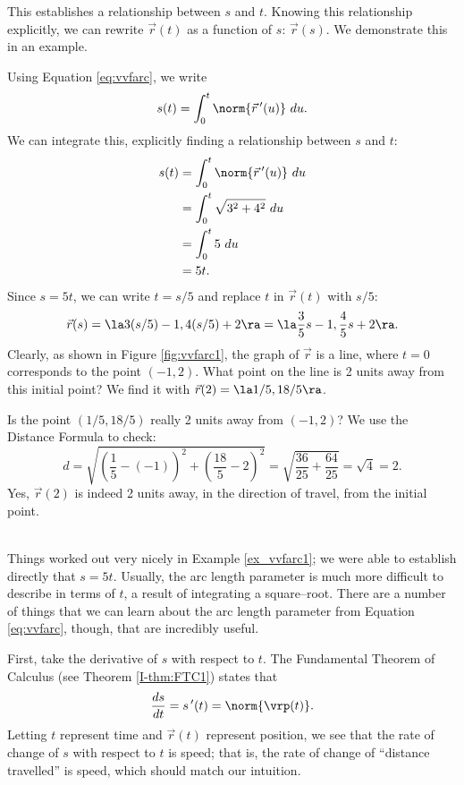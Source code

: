 This establishes a relationship between $s$ and $t$. Knowing this relationship explicitly, we can rewrite $\vec r(t)$ as a function of $s$: $\vec r(s)$. We demonstrate this in an example.\\

{Using Equation \eqref{eq:vvfarc}, we write
\[
s(t) = \int_0^t \norm{\vec r\,'(u)}\ du.
\]
We can integrate this, explicitly finding a relationship between $s$ and $t$:
\begin{align*}
s(t) &= \int_0^t \norm{\vec r\,'(u)}\ du \\
			&= \int_0^t \sqrt{3^2+4^2}\ du\\
			&= \int_0^t 5\ du\\
			&= 5t.
\end{align*}
Since $s=5t$, we can write $t=s/5$ and replace $t$ in $\vec r(t)$ with $s/5$:
\[
\vec r(s) = \la 3(s/5)-1, 4(s/5)+2\ra = \la \frac35s-1,\frac45s+2\ra.
\]
Clearly, as shown in Figure \ref{fig:vvfarc1}, the graph of $\vec r$ is a line, where $t=0$ corresponds to the point $(-1,2)$. What point on the line is 2 units away from this initial point? We find it with $\vec r(2) = \la 1/5, 18/5\ra$. 

Is the point $(1/5,18/5)$ really 2 units away from $(-1,2)$? We use the Distance Formula to check:
\[
d = \sqrt{\left(\frac15-(-1)\right)^2+ \left(\frac{18}5-2\right)^2} = \sqrt{\frac{36}{25}+\frac{64}{25}} = \sqrt{4}=2.
\]
Yes, $\vec r(2)$ is indeed 2 units away, in the direction of travel, from the initial point.
}\\

Things worked out very nicely in Example \ref{ex_vvfarc1}; we were able to establish directly that $s=5t$. Usually, the arc length parameter is much more difficult to describe in terms of $t$, a result of integrating a square--root. There are a number of things that we can learn about the arc length parameter from Equation \eqref{eq:vvfarc}, though, that are incredibly useful.

First, %
take the derivative of $s$ with respect to $t$. The Fundamental Theorem of Calculus (see Theorem \ref{I-thm:FTC1}) states that
\begin{equation}
\frac{ds}{dt}=s\,'(t) = \norm{\vrp(t)}.\label{eq:vvfarc3}
\end{equation}
Letting $t$ represent time and $\vec r(t)$ represent position, we see that the rate of change of $s$ with respect to $t$ is speed; that is, the rate of change of ``distance travelled'' is speed, which should match our intuition.

